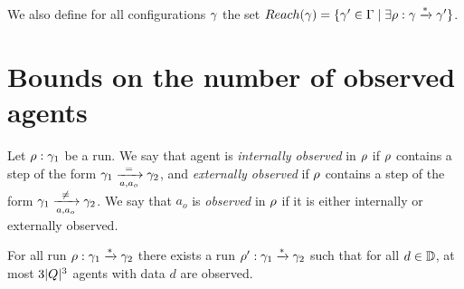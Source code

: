 \documentclass[a4paper,UKenglish,cleveref, autoref, thm-restate]{lipics-v2021}
\begin{document}
	We also define for all configurations $\config$ the set $\Reach(\config) = \set{\config' \in \configset \mid \exists \run : \config \xrightarrow{*} \config'}$.

	\section{Bounds on the number of observed agents}
	
		\begin{definition}
		Let $\run : \config_1$ be a run.
		We say that agent is \emph{internally observed} in $\run$ if $\run$ contains a step of the form $\config_1 \step{=}{a}{a_o} \config_2$, and \emph{externally observed} if $\run$ contains a step of the form $\config_1 \step{\neq}{a}{a_o} \config_2$.
		We say that $a_o$ is \emph{observed} in $\run$ if it is either internally or externally observed.
	\end{definition}
	
	
	\begin{lemma}
		For all run $\run : \config_1 \xrightarrow{*} \config_2$ there exists a run $\run' : \config_1 \xrightarrow{*} \config_2$ such that for all $d \in \Dataset$, at most $3\size{Q}^3$ agents with data $d$ are observed.
	\end{lemma}
	
\end{document}
